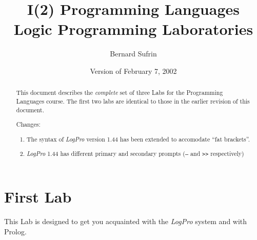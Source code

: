 \documentclass{article}
\title{I(2) Programming Languages\\Logic Programming Laboratories}
\author{Bernard Sufrin}
\date{Version of February 7, 2002}
\def\LOGPRO{{\ttfamily\slshape LogPro}\xspace}
\begin{document}
\maketitle
\begin{abstract}
\noindent This document describes the {\it complete} set of three Labs for the
Programming Languages course. The first two labs are identical to those
in the earlier revision of this document. 

\noindent Changes:
\begin{enumerate}
\item  The syntax of \LOGPRO version 1.44 has been extended to accomodate ``fat brackets''. 
\item  \LOGPRO  1.44 has different primary and secondary prompts ({\tt --} and {\tt >>} respectively)
\end{enumerate}
\end{abstract}

\section{First Lab}
This Lab is designed to get you acquainted with the \LOGPRO system and 
with Prolog.
\end{document}
